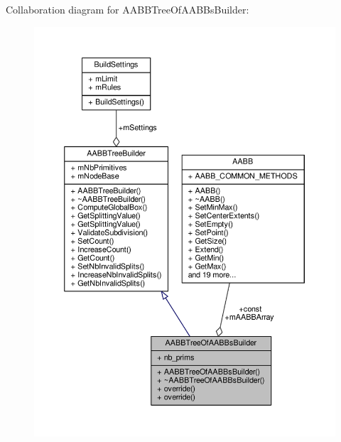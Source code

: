 Collaboration diagram for A\+A\+B\+B\+Tree\+Of\+A\+A\+B\+Bs\+Builder\+:
\nopagebreak
\begin{figure}[H]
\begin{center}
\leavevmode
\includegraphics[width=350pt]{d3/ddc/classAABBTreeOfAABBsBuilder__coll__graph}
\end{center}
\end{figure}
